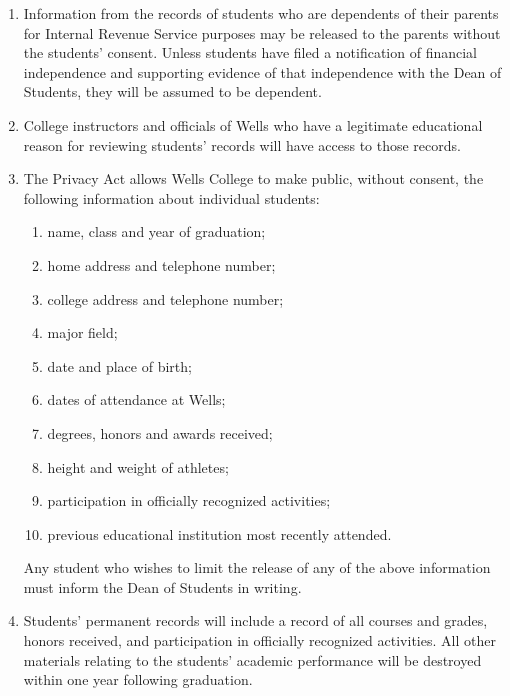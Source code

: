 \documentclass{manual}
\newcommand{\itemLevelA}{\alph*.}
\newcommand{\itemLevelB}{\arabic*)}
\newcommand{\itemRefA}{\alph*}
\newcommand{\itemRefB}{\arabic*}
\begin{document}
\begin{enumerate}[label=\itemLevelA,ref=\itemRefA]
\begin{enumerate}[label=\itemLevelB,ref=\itemRefB]
\item Information from the records of students who are dependents of their parents for Internal Revenue Service purposes may be released to the parents without the students' consent. Unless students have filed a notification of financial independence and supporting evidence of that independence with the Dean of Students, they will be assumed to be dependent.


\item College instructors and officials of Wells who have a legitimate educational reason for reviewing students' records will have access to those records.


\item The Privacy Act allows Wells College to make public, without consent, the following information about individual students:
\begin{enumerate}[label=\alph*)]

\item name, class and year of graduation;

\item home address and telephone number;

\item college address and telephone number;

\item major field;

\item date and place of birth;

\item dates of attendance at Wells;

\item degrees, honors and awards received;

\item height and weight of athletes;

\item participation in officially recognized activities;

\item previous educational institution most recently attended.
\end{enumerate}

Any student who wishes to limit the release of any of the above information must inform the Dean of Students in writing.

\item Students' permanent records will include a record of all courses and grades, honors received, and participation in officially recognized activities. All other materials relating to the students' academic performance will be destroyed within one year following graduation.

\end{enumerate}
\end{enumerate}
\end{document}
